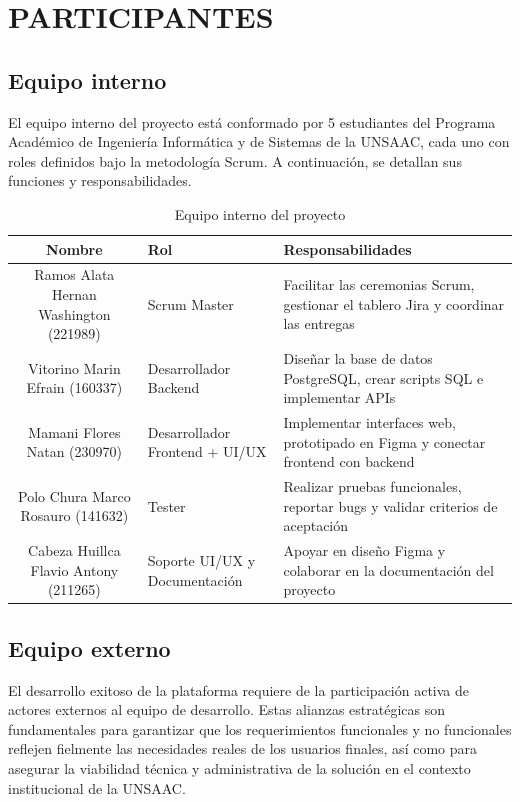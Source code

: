 \newpage
\chapter{PARTICIPANTES}

\section{Equipo interno}

El equipo interno del proyecto está conformado por 5 estudiantes del Programa Académico de Ingeniería Informática 
y de Sistemas de la UNSAAC, cada uno con roles definidos bajo la metodología Scrum. A continuación, se detallan 
sus funciones y responsabilidades.

\begin{table}[H]
    \centering
    \caption{Equipo interno del proyecto}
    \begin{tabular}{|c|p{3cm}|p{5cm}|}
        \hline
        \textbf{Nombre} & \textbf{Rol} & \textbf{Responsabilidades} \\
        \hline
        Ramos Alata Hernan Washington (221989) & Scrum Master & Facilitar las ceremonias Scrum, gestionar el tablero Jira y coordinar las entregas \\
        \hline
        Vitorino Marin Efrain (160337) & Desarrollador Backend & Diseñar la base de datos PostgreSQL, crear scripts SQL e implementar APIs \\
        \hline
        Mamani Flores Natan (230970) & Desarrollador Frontend + UI/UX & Implementar interfaces web, prototipado en Figma y conectar frontend con backend \\
        \hline
        Polo Chura Marco Rosauro (141632) & Tester & Realizar pruebas funcionales, reportar bugs y validar criterios de aceptación \\
        \hline
        Cabeza Huillca Flavio Antony (211265) & Soporte UI/UX y Documentación & Apoyar en diseño Figma y colaborar en la documentación del proyecto \\
        \hline
    \end{tabular}
\end{table}

\section{Equipo externo}

El desarrollo exitoso de la plataforma requiere de la participación activa de actores externos
al equipo de desarrollo. Estas alianzas estratégicas son fundamentales para garantizar que los
requerimientos funcionales y no funcionales reflejen fielmente las necesidades reales de los
usuarios finales, así como para asegurar la viabilidad técnica y administrativa de la solución
en el contexto institucional de la UNSAAC.

